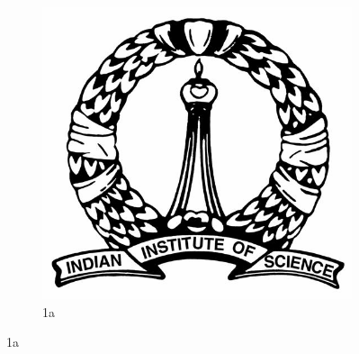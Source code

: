 \documentclass[10pt,a4paper]{article}
\begin{document}
\begin{figure}

\begin{subfigure}{.30\textwidth}
\centering
\includegraphics[width=1.0\linewidth]{IISc_logo.jpg}
\caption{1a}
\label{fig:sfig1}
\end{subfigure}


\end{figure}
\end{document}
